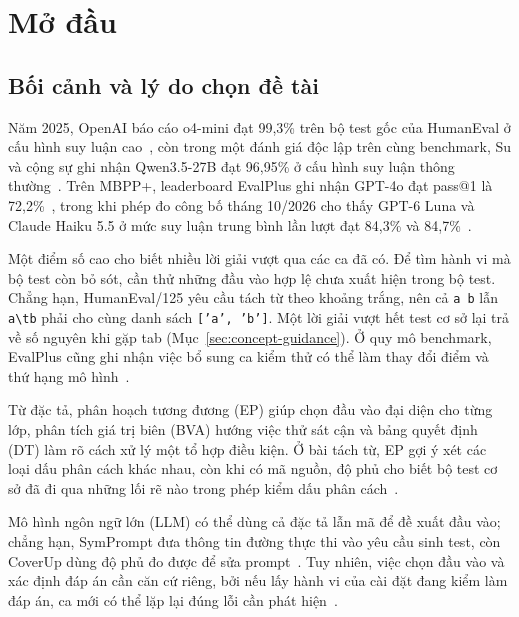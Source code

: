 \chapter*{Mở đầu}
{}
\label{chap:introduction}

\section*{Bối cảnh và lý do chọn đề tài}

Năm 2025, OpenAI báo cáo o4-mini đạt 99,3\% trên bộ test gốc của HumanEval ở cấu hình suy luận cao~\cite{openaiSimpleEvals}, còn trong một đánh giá độc lập trên cùng benchmark, Su và cộng sự ghi nhận Qwen3.5-27B đạt 96,95\% ở cấu hình suy luận thông thường~\cite{su2026massiveactivations}. Trên MBPP+, leaderboard EvalPlus ghi nhận GPT-4o đạt pass@1 là 72,2\%~\cite{evalplusLeaderboard}, trong khi phép đo công bố tháng 10/2026 cho thấy GPT-6 Luna và Claude Haiku 5.5 ở mức suy luận trung bình lần lượt đạt 84,3\% và 84,7\%~\cite{li2026mercuryCoding}.

Một điểm số cao cho biết nhiều lời giải vượt qua các ca đã có. Để tìm hành vi mà bộ test còn bỏ sót, cần thử những đầu vào hợp lệ chưa xuất hiện trong bộ test. Chẳng hạn, HumanEval/125 yêu cầu tách từ theo khoảng trắng, nên cả \texttt{a b} lẫn \texttt{a\textbackslash tb} phải cho cùng danh sách \texttt{['a', 'b']}. Một lời giải vượt hết test cơ sở lại trả về số nguyên khi gặp tab (Mục~\ref{sec:concept-guidance}). Ở quy mô benchmark, EvalPlus cũng ghi nhận việc bổ sung ca kiểm thử có thể làm thay đổi điểm và thứ hạng mô hình~\cite{liu2023evalplus}.

Từ đặc tả, phân hoạch tương đương (EP) giúp chọn đầu vào đại diện cho từng lớp, phân tích giá trị biên (BVA) hướng việc thử sát cận và bảng quyết định (DT) làm rõ cách xử lý một tổ hợp điều kiện. Ở bài tách từ, EP gợi ý xét các loại dấu phân cách khác nhau, còn khi có mã nguồn, độ phủ cho biết bộ test cơ sở đã đi qua những lối rẽ nào trong phép kiểm dấu phân cách~\cite[ch.~5--6]{pham2014kiemthu}.

Mô hình ngôn ngữ lớn (LLM) có thể dùng cả đặc tả lẫn mã để đề xuất đầu vào; chẳng hạn, SymPrompt đưa thông tin đường thực thi vào yêu cầu sinh test, còn CoverUp dùng độ phủ đo được để sửa prompt~\cite{ryan2024symprompt,pizzorno2025coverup}. Tuy nhiên, việc chọn đầu vào và xác định đáp án cần căn cứ riêng, bởi nếu lấy hành vi của cài đặt đang kiểm làm đáp án, ca mới có thể lặp lại đúng lỗi cần phát hiện~\cite{mathews2024design}.

